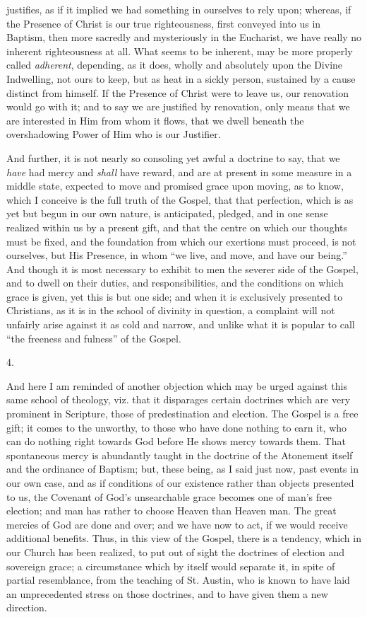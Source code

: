 justifies, as if it implied we had something in ourselves to rely
upon; whereas, if the Presence of Christ is our true righteousness,
first conveyed into us in Baptism, then more sacredly and mysteriously
in the Eucharist, we have really no inherent righteousness at all.
What seems to be inherent, may be more properly called \emph{adherent},
depending, as it does, wholly and absolutely upon the Divine
Indwelling, not ours to keep, but as heat in a sickly person,
sustained by a cause distinct from himself. If the Presence of Christ
were to leave us, our renovation would go with it; and to say we
are justified by renovation, only means that we are interested in Him
from whom it flows, that we dwell beneath the overshadowing Power of
Him who is our Justifier.

And further, it is not nearly so consoling yet awful a doctrine to
say, that we \emph{have} had mercy and \emph{shall} have reward, and
are at present in some measure in a middle state, expected to move and
promised grace upon moving, as to know, which I conceive is the full
truth of the Gospel, that that perfection, which is as yet but begun
in our own nature, is anticipated, pledged, and in one sense realized
within us by a present gift, and that the centre on which our thoughts
must be fixed, and the foundation from which our exertions must
proceed, is not ourselves, but His Presence, in whom ``we live,
and move, and have our being.'' And though it is most necessary to
exhibit to men the severer side of the Gospel, and to dwell on their
duties, and responsibilities, and the conditions on which grace is
given, yet this is but one side; and when it is exclusively presented
to Christians, as it is in the school of divinity in question, a
complaint will not unfairly arise against it as cold and narrow, and
unlike what it is popular to call ``the freeness and fulness''
of the Gospel.

4.

And here I am reminded of another objection which may be urged
against this same school of theology, viz. that it disparages certain
doctrines which are very prominent in Scripture, those of
predestination and election. The Gospel is a free gift; it comes to
the unworthy, to those who have done nothing to earn it, who can
do nothing right towards God before He shows mercy towards them. That
spontaneous mercy is abundantly taught in the doctrine of the
Atonement itself and the ordinance of Baptism; but, these being, as I
said just now, past events in our own case, and as if conditions of
our existence rather than objects presented to us, the Covenant of
God's unsearchable grace becomes one of man's free election; and man
has rather to choose Heaven than Heaven man. The great mercies of God
are done and over; and we have now to act, if we would receive
additional benefits. Thus, in this view of the Gospel, there is a
tendency, which in our Church has been realized, to put out of sight
the doctrines of election and sovereign grace; a circumstance which by
itself would separate it, in spite of partial resemblance, from the
teaching of St. Austin, who is known to have laid an unprecedented
stress on those doctrines, and to have given them a new direction.

